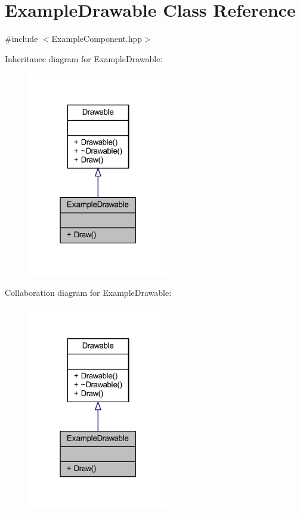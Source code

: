 \hypertarget{class_example_drawable}{\section{Example\-Drawable Class Reference}
\label{class_example_drawable}
}


{\ttfamily \#include $<$Example\-Component.\-hpp$>$}



Inheritance diagram for Example\-Drawable\-:\nopagebreak
\begin{figure}[H]
\begin{center}
\leavevmode
\includegraphics[width=175pt]{class_example_drawable__inherit__graph}
\end{center}
\end{figure}


Collaboration diagram for Example\-Drawable\-:\nopagebreak
\begin{figure}[H]
\begin{center}
\leavevmode
\includegraphics[width=175pt]{class_example_drawable__coll__graph}
\end{center}
\end{figure}
